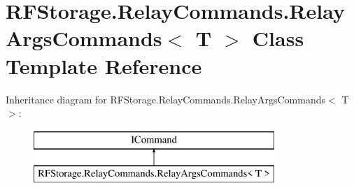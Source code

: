 \hypertarget{class_r_f_storage_1_1_relay_commands_1_1_relay_args_commands}{}\section{R\+F\+Storage.\+Relay\+Commands.\+Relay\+Args\+Commands$<$ T $>$ Class Template Reference}
\label{class_r_f_storage_1_1_relay_commands_1_1_relay_args_commands}
Inheritance diagram for R\+F\+Storage.\+Relay\+Commands.\+Relay\+Args\+Commands$<$ T $>$\+:\begin{figure}[H]
\begin{center}
\leavevmode
\includegraphics[height=2.000000cm]{class_r_f_storage_1_1_relay_commands_1_1_relay_args_commands}
\end{center}
\end{figure}

